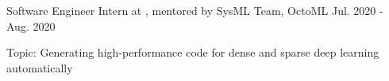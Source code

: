 

\begin{cventries}

\cventry
	{Software Engineer Intern at , mentored by } %
	{SysML Team, OctoML} %
	{Jul. 2020 - Aug. 2020} %
	{} %
	{
		\begin{cvitems} %
			\item{Topic: Generating high-performance code for dense and sparse deep learning automatically}
		\end{cvitems}
    }

\end{cventries}
